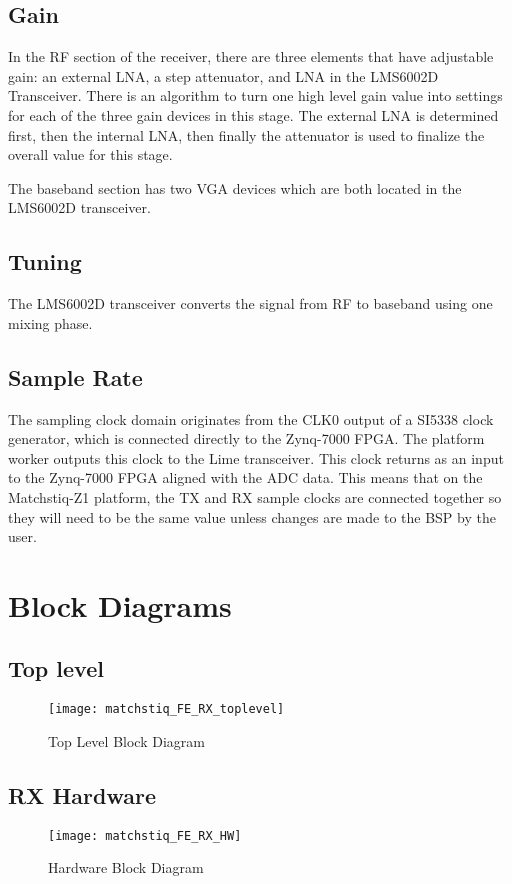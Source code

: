 \subsection*{Gain}
In the RF section of the receiver, there are three elements that have adjustable gain: an external LNA, a step attenuator, and LNA in the LMS6002D Transceiver.  There is an algorithm to turn one high level gain value into settings for each of the three gain devices in this stage.  The external LNA is determined first, then the internal LNA, then finally the attenuator is used to finalize the overall value for this stage.\par\medskip
\noindent The baseband section has two VGA devices which are both located in the LMS6002D transceiver.
\subsection*{Tuning}
The LMS6002D transceiver converts the signal from RF to baseband using one mixing phase.
\subsection*{Sample Rate}
The sampling clock domain originates from  the CLK0 output of a SI5338 clock generator, which is connected directly to the Zynq-7000 FPGA. The platform worker outputs this clock to the Lime transceiver.  This clock returns as an input to the Zynq-7000 FPGA aligned with the ADC data. This means that on the Matchstiq-Z1 platform, the TX and RX sample clocks are connected together so they will need to be the same value unless changes are made to the BSP by the user.

\section*{Block Diagrams}
\subsection*{Top level}
\begin{figure}[ht]
	\centerline{\texttt{[image: matchstiq\_FE\_RX\_toplevel]}}
	\caption{Top Level Block Diagram}
	\label{fig:top}
\end{figure}
\vspace{25 mm}

\subsection*{RX Hardware}
\begin{figure}[ht]
	\centerline{\texttt{[image: matchstiq\_FE\_RX\_HW]}}
	\caption{Hardware Block Diagram}
	\label{fig:hw}
\end{figure}
\vspace{25 mm}
\newpage

